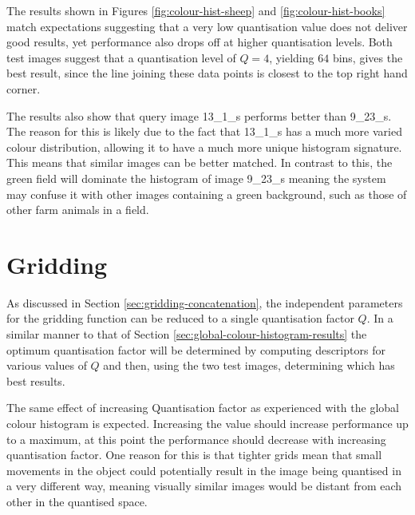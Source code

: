 The results shown in Figures \ref{fig:colour-hist-sheep} and \ref{fig:colour-hist-books} match expectations suggesting that a very low quantisation value does not deliver good results, yet performance also drops off at higher quantisation levels. Both test images suggest that a quantisation level of $Q=4$, yielding $64$ bins, gives the best result, since the line joining these data points is closest to the top right hand corner.

The results also show that query image 13\_1\_s performs better than 9\_23\_s. The reason for this is likely due to the fact that 13\_1\_s has a much more varied colour distribution, allowing it to have a much more unique histogram signature. This means that similar images can be better matched. In contrast to this, the green field will dominate the histogram of image 9\_23\_s meaning the system may confuse it with other images containing a green background, such as those of other farm animals in a field.

\FloatBarrier
\section{Gridding} \label{sec:gridding-results}

As discussed in Section \ref{sec:gridding-concatenation}, the independent parameters for the gridding function can be reduced to a single quantisation factor $Q$. In a similar manner to that of Section \ref{sec:global-colour-histogram-results} the optimum quantisation factor will be determined by computing descriptors for various values of $Q$ and then, using the two test images, determining which has best results. 

The same effect of increasing Quantisation factor as experienced with the global colour histogram is expected. Increasing the value should increase performance up to a maximum, at this point the performance should decrease with increasing quantisation factor. One reason for this is that tighter grids mean that small movements in the object could potentially result in the image being quantised in a very different way, meaning visually similar images would be distant from each other in the quantised space.


